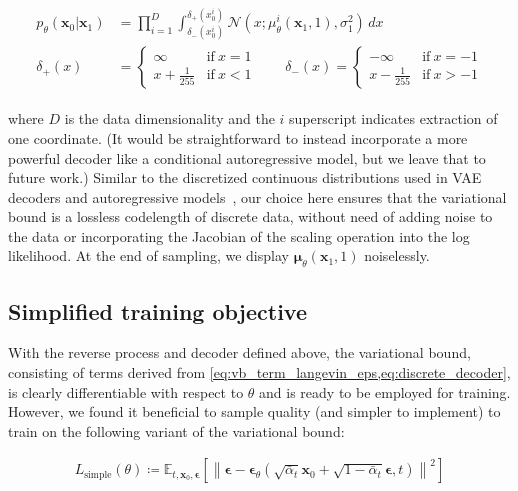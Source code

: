 \begin{align}\begin{split}
p_\theta(\mathbf{x}_0 | \mathbf{x}_1) &= \prod_{i=1}^D \int_{\delta_{-}(x_0^i)}^{\delta_{+}(x_0^i)} \mathcal{N}(x; \mu_\theta^i(\mathbf{x}_1, 1), \sigma_1^2) \, dx \label{eq:discrete_decoder} \\
\delta_{+}(x) &= \begin{cases}
\infty & \text{if}\ x=1 \\
x+\frac{1}{255} & \text{if}\ x < 1
\end{cases}
\qquad \delta_{-}(x) = \begin{cases}
-\infty & \text{if}\ x=-1 \\
x-\frac{1}{255} & \text{if}\ x > -1
\end{cases}
\end{split}\end{align}

where $D$ is the data dimensionality and the $i$ superscript indicates extraction of one coordinate. (It would be straightforward to instead incorporate a more powerful decoder like a conditional autoregressive model, but we leave that to future work.) Similar to the discretized continuous distributions used in VAE decoders and autoregressive models~\citep{kingma2016improved,salimans2017pixelcnn++}, our choice here ensures that the variational bound is a lossless codelength of discrete data, without need of adding noise to the data or incorporating the Jacobian of the scaling operation into the log likelihood. At the end of sampling, we display ${\boldsymbol{\mu}}_\theta(\mathbf{x}_1,1)$ noiselessly.

\subsection{Simplified training objective}
\label{sec:simplified_training_objective}

With the reverse process and decoder defined above, the variational bound, consisting of terms derived from \ref{eq:vb_term_langevin_eps,eq:discrete_decoder}, is clearly differentiable with respect to $\theta$ and is ready to be employed for training. However, we found it beneficial to sample quality (and simpler to implement) to train on the following variant of the variational bound:

\begin{align}
 L_\mathrm{simple}(\theta) \coloneqq \mathbb{E}_{t, \mathbf{x}_0, {\boldsymbol{\epsilon}}}\!\left[ \left\| {\boldsymbol{\epsilon}} - {\boldsymbol{\epsilon}}_\theta(\sqrt{\bar\alpha_t} \mathbf{x}_0 + \sqrt{1-\bar\alpha_t}{\boldsymbol{\epsilon}}, t) \right\|^2\right] \label{eq:training_objective_simple}
\end{align}


